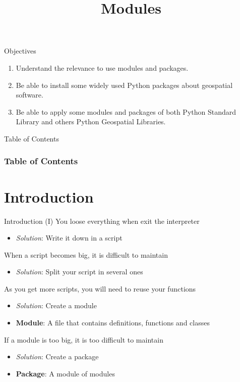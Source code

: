 \documentclass[10pt,compress]{beamer} %
\title[Modules]{Modules}
\author{}
\institute{\asignatura}
\date{}
\begin{document}
{\titlepageBlue
    \begin{frame}
        \titlepage
    \end{frame}
}

\begin{frame}[plain]{}
	\begin{block}{Objectives}
		\begin{enumerate}
		\item Understand the relevance to use modules and packages.
		\item Be able to install some widely used Python packages about  geospatial software.
		\item Be able to apply some modules and packages of both Python Standard Library and others Python Geospatial Libraries.
		\end{enumerate}
	\end{block}
\end{frame}

{
\eliminarNavegacion
\begin{frame}[shrink]{Table of Contents}
 \frametitle{Table of Contents}
 \tableofcontents
\end{frame}
}

\section{Introduction}
\begin{frame}{Introduction (I)}
		You loose everything when exit the interpreter
			\begin{itemize}
			\item \textit{Solution}: Write it down in a script
			\end{itemize}
		When a script becomes big, it is difficult to maintain
			\begin{itemize}
			\item \textit{Solution}: Split your script in several ones
			\end{itemize}
		As you get more scripts, you will need to reuse your functions
			\begin{itemize}
			\item \textit{Solution}: Create a \alert{module}
			\item \textbf{Module}: A file that contains definitions, functions and classes
			\end{itemize}
		If a module is too big, it is too difficult to maintain
			\begin{itemize}
			\item \textit{Solution}: Create a \alert{package}
			\item \textbf{Package}: A module of modules
			\end{itemize}
\end{frame}
\end{document}
